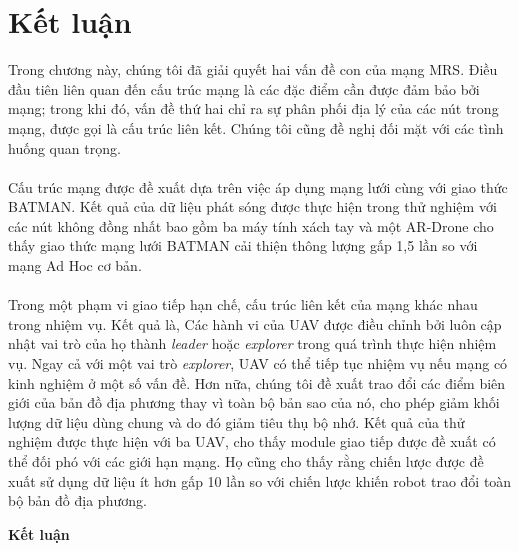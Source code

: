 \documentclass[11pt,openany]{book}
\begin{document}
\section{Kết luận}
Trong chương này, chúng tôi đã giải quyết hai vấn đề con của mạng MRS. Điều đầu tiên liên quan đến cấu trúc mạng là các đặc điểm cần được đảm bảo bởi mạng; trong khi đó, vấn đề thứ hai chỉ ra sự phân phối địa lý của các nút trong mạng, được gọi là cấu trúc liên kết. Chúng tôi cũng đề nghị đối mặt với các tình huống quan trọng.\\\\
Cấu trúc mạng được đề xuất dựa trên việc áp dụng mạng lưới cùng với giao thức BATMAN. Kết quả của dữ liệu phát sóng được thực hiện trong thử nghiệm với các nút không đồng nhất bao gồm ba máy tính xách tay và một AR-Drone cho thấy giao thức mạng lưới BATMAN cải thiện thông lượng gấp 1,5 lần so với mạng Ad Hoc cơ bản.\\\\
Trong một phạm vi giao tiếp hạn chế, cấu trúc liên kết của mạng khác nhau trong nhiệm vụ. Kết quả là, Các hành vi của UAV được điều chỉnh bởi luôn cập nhật vai trò của họ thành \textit{leader} hoặc \textit{explorer} trong quá trình thực hiện nhiệm vụ. Ngay cả với một vai trò \textit{explorer}, UAV có thể tiếp tục nhiệm vụ nếu mạng có kinh nghiệm ở một số vấn đề. Hơn nữa, chúng tôi đề xuất trao đổi các điểm biên giới của bản đồ địa phương thay vì toàn bộ bản sao của nó, cho phép giảm khối lượng dữ liệu dùng chung và do đó giảm tiêu thụ bộ nhớ. Kết quả của thử nghiệm được thực hiện với ba UAV, cho thấy module giao tiếp được đề xuất có thể đối phó với các giới hạn mạng. Họ cũng cho thấy rằng chiến lược được đề xuất sử dụng dữ liệu ít hơn gấp 10 lần so với chiến lược khiến robot trao đổi toàn bộ bản đồ địa phương.
\newpage
\thispagestyle{plain}
\begin{center}
    \Huge
    \textbf{Kết luận}
\end{center}

\printbibliography[heading=bibintoc,title=Tài liệu tham khảo]
\end{document}
